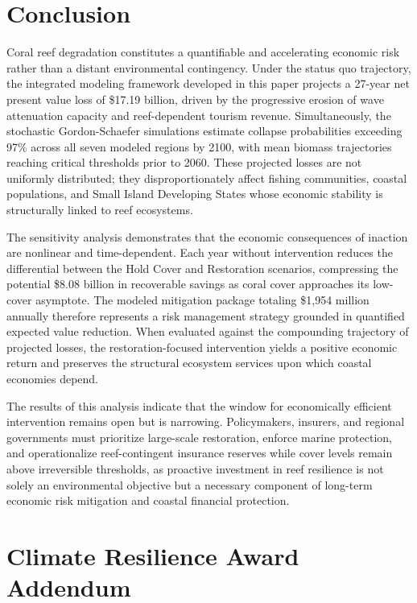 \documentclass[10pt,letterpaper]{article}
\newcounter{gs}
\begin{document}
\section*{Conclusion}

Coral reef degradation constitutes a quantifiable and accelerating economic risk rather than a distant environmental contingency. Under the status quo trajectory, the integrated modeling framework developed in this paper projects a 27-year net present value loss of \$17.19 billion, driven by the progressive erosion of wave attenuation capacity and reef-dependent tourism revenue. Simultaneously, the stochastic Gordon-Schaefer simulations estimate collapse probabilities exceeding 97\% across all seven modeled regions by 2100, with mean biomass trajectories reaching critical thresholds prior to 2060. These projected losses are not uniformly distributed; they disproportionately affect fishing communities, coastal populations, and Small Island Developing States whose economic stability is structurally linked to reef ecosystems.

The sensitivity analysis demonstrates that the economic consequences of inaction are nonlinear and time-dependent. Each year without intervention reduces the differential between the Hold Cover and Restoration scenarios, compressing the potential \$8.08 billion in recoverable savings as coral cover approaches its low-cover asymptote. The modeled mitigation package totaling \$1{,}954 million annually therefore represents a risk management strategy grounded in quantified expected value reduction. When evaluated against the compounding trajectory of projected losses, the restoration-focused intervention yields a positive economic return and preserves the structural ecosystem services upon which coastal economies depend.

The results of this analysis indicate that the window for economically efficient intervention remains open but is narrowing. Policymakers, insurers, and regional governments must prioritize large-scale restoration, enforce marine protection, and operationalize reef-contingent insurance reserves while cover levels remain above irreversible thresholds, as proactive investment in reef resilience is not solely an environmental objective but a necessary component of long-term economic risk mitigation and coastal financial protection.

\newpage
{}
\section*{Climate Resilience Award Addendum}
\end{document}
